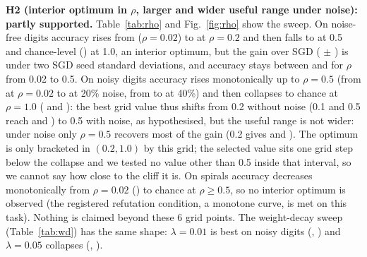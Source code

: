 \textbf{H2 (interior optimum in $\rho$, larger and wider useful range under noise): partly supported.} Table~\ref{tab:rho} and Fig.~\ref{fig:rho} show the sweep. On noise-free digits accuracy rises from  ($\rho=0.02$) to  at $\rho=0.2$ and then falls to  at 0.5 and chance-level () at 1.0, an interior optimum, but the gain over SGD ( $\pm$ ) is under two SGD seed standard deviations, and accuracy stays between  and  for $\rho$ from 0.02 to 0.5. On noisy digits accuracy rises monotonically up to $\rho=0.5$ (from  at $\rho=0.02$ to  at 20\% noise, from  to  at 40\%) and then collapses to chance at $\rho=1.0$ ( and ): the best grid value thus shifts from 0.2 without noise (0.1 and 0.5 reach  and ) to 0.5 with noise, as hypothesised, but the useful range is not wider: under noise only $\rho=0.5$ recovers most of the gain (0.2 gives  and ). The optimum is only bracketed in $(0.2,1.0)$ by this grid; the selected value sits one grid step below the collapse and we tested no value other than 0.5 inside that interval, so we cannot say how close to the cliff it is. On spirals accuracy decreases monotonically from $\rho=0.02$ () to chance at $\rho\ge0.5$, so no interior optimum is observed (the registered refutation condition, a monotone curve, is met on this task). Nothing is claimed beyond these 6 grid points. The weight-decay sweep (Table~\ref{tab:wd}) has the same shape: $\lambda=0.01$ is best on noisy digits (, ) and $\lambda=0.05$ collapses (, ).

